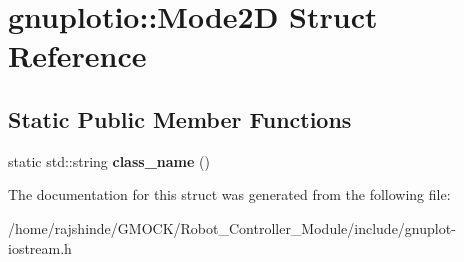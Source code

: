 \hypertarget{structgnuplotio_1_1_mode2_d}{}\section{gnuplotio\+:\+:Mode2D Struct Reference}
\label{structgnuplotio_1_1_mode2_d}
\subsection*{Static Public Member Functions}
\begin{DoxyCompactItemize}
\item 
static std\+::string {\bfseries class\+\_\+name} ()\hypertarget{structgnuplotio_1_1_mode2_d_aaf35c9cd117de8bc5dbc2d5ec1224232}{}\label{structgnuplotio_1_1_mode2_d_aaf35c9cd117de8bc5dbc2d5ec1224232}

\end{DoxyCompactItemize}


The documentation for this struct was generated from the following file\+:\begin{DoxyCompactItemize}
\item 
/home/rajshinde/\+G\+M\+O\+C\+K/\+Robot\+\_\+\+Controller\+\_\+\+Module/include/gnuplot-\/iostream.\+h\end{DoxyCompactItemize}
